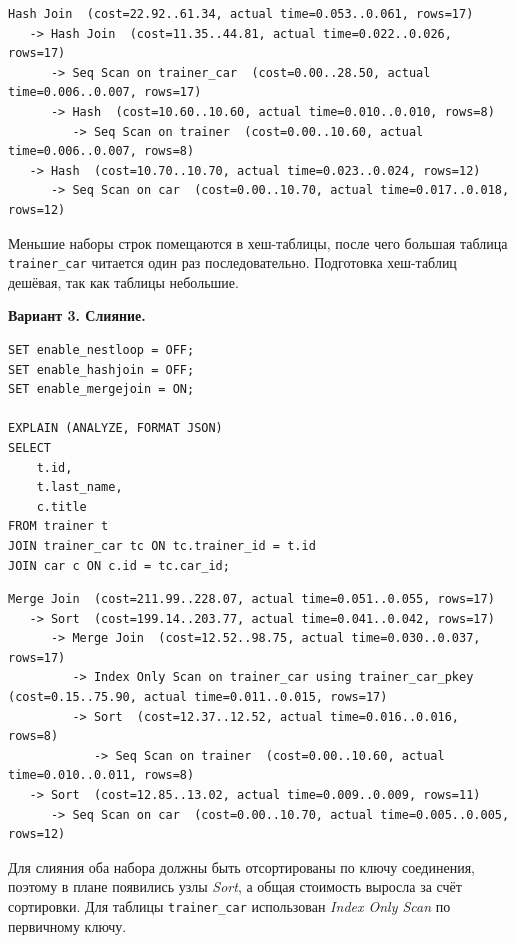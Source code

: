 \documentclass[oneside,a4paper,14pt]{extarticle}
\begin{document}
\begin{Verbatim}[fontsize=\footnotesize,breaklines=true,breakanywhere=true]
Hash Join  (cost=22.92..61.34, actual time=0.053..0.061, rows=17)
   -> Hash Join  (cost=11.35..44.81, actual time=0.022..0.026, rows=17)
      -> Seq Scan on trainer_car  (cost=0.00..28.50, actual time=0.006..0.007, rows=17)
      -> Hash  (cost=10.60..10.60, actual time=0.010..0.010, rows=8)
         -> Seq Scan on trainer  (cost=0.00..10.60, actual time=0.006..0.007, rows=8)
   -> Hash  (cost=10.70..10.70, actual time=0.023..0.024, rows=12)
      -> Seq Scan on car  (cost=0.00..10.70, actual time=0.017..0.018, rows=12)
\end{Verbatim}


Меньшие наборы строк помещаются в хеш-таблицы, после чего большая таблица \texttt{trainer\_car} читается один раз последовательно. Подготовка хеш-таблиц дешёвая, так как таблицы небольшие.


\textbf{Вариант 3. Слияние.}

\begin{verbatim}
SET enable_nestloop = OFF;
SET enable_hashjoin = OFF;
SET enable_mergejoin = ON;

EXPLAIN (ANALYZE, FORMAT JSON)
SELECT
    t.id,
    t.last_name,
    c.title
FROM trainer t
JOIN trainer_car tc ON tc.trainer_id = t.id
JOIN car c ON c.id = tc.car_id;
\end{verbatim}

\begin{Verbatim}[fontsize=\footnotesize,breaklines=true,breakanywhere=true]
Merge Join  (cost=211.99..228.07, actual time=0.051..0.055, rows=17)
   -> Sort  (cost=199.14..203.77, actual time=0.041..0.042, rows=17)
      -> Merge Join  (cost=12.52..98.75, actual time=0.030..0.037, rows=17)
         -> Index Only Scan on trainer_car using trainer_car_pkey  (cost=0.15..75.90, actual time=0.011..0.015, rows=17)
         -> Sort  (cost=12.37..12.52, actual time=0.016..0.016, rows=8)
            -> Seq Scan on trainer  (cost=0.00..10.60, actual time=0.010..0.011, rows=8)
   -> Sort  (cost=12.85..13.02, actual time=0.009..0.009, rows=11)
      -> Seq Scan on car  (cost=0.00..10.70, actual time=0.005..0.005, rows=12)
\end{Verbatim}


Для слияния оба набора должны быть отсортированы по ключу соединения, поэтому в плане появились узлы \textit{Sort}, а общая стоимость выросла за счёт сортировки. Для таблицы \texttt{trainer\_car} использован \textit{Index Only Scan} по первичному ключу.
\end{document}
